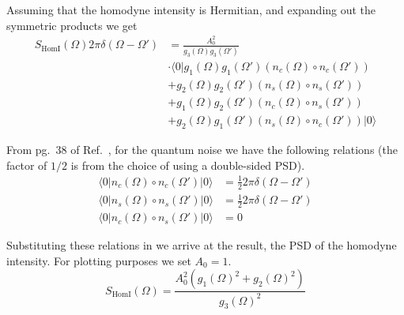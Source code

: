 \documentclass[aps,pra,superscriptaddress,reprint,nofootinbib]{revtex4-1}
\begin{document}
Assuming that the homodyne intensity is Hermitian, and expanding out the symmetric products we get
\begin{align}
S_\mathrm{HomI}(\Omega) 2 \pi \delta(\Omega - \Omega') &= \frac{A_0^2}{g_3(\Omega) g_3(\Omega')} \\
&\cdot \langle0| g_1(\Omega) g_1(\Omega') (n_c(\Omega) \circ n_c(\Omega'))\nonumber\\
&+ g_2(\Omega) g_2(\Omega') (n_s(\Omega) \circ n_s(\Omega')) \nonumber\\
&+ g_1(\Omega) g_2(\Omega') (n_c(\Omega) \circ n_s(\Omega'))\nonumber \\
&+ g_2(\Omega) g_1(\Omega') (n_s(\Omega) \circ n_c(\Omega')) |0\rangle\nonumber
\end{align}


From pg.~38 of Ref.~\cite{Danilishin_2012}, for the quantum noise we have the following relations (the factor of $1/2$ is from the choice of using a double-sided PSD).
\begin{align}
\langle0|n_c(\Omega) \circ n_c(\Omega')|0\rangle &= \frac{1}{2} 2 \pi \delta(\Omega - \Omega') \\
\langle0|n_s(\Omega) \circ n_s(\Omega')|0\rangle &= \frac{1}{2} 2 \pi \delta(\Omega - \Omega') \nonumber\\
\langle0|n_c(\Omega) \circ n_s(\Omega')|0\rangle &= 0\nonumber
\end{align}

Substituting these relations in we arrive at the result, the PSD of the homodyne intensity. For plotting purposes we set $A_0 = 1$.
\begin{equation}
S_\mathrm{HomI}(\Omega) = \frac{A_0^2 \left( g_1(\Omega)^2 + g_2(\Omega)^2 \right)}{g_3(\Omega)^2}
\end{equation}


\nocite{*}


\end{document}
